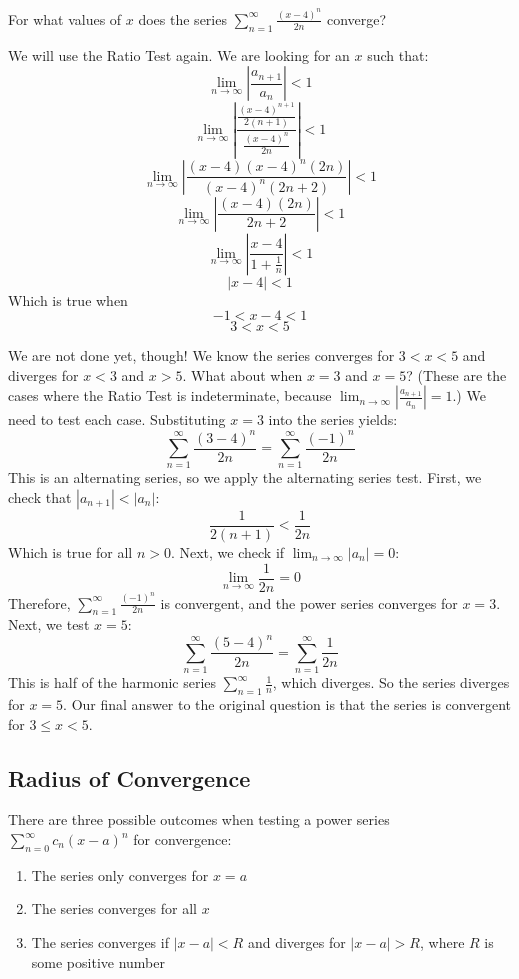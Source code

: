 \begin{Worked}
\begin{Problem}
For what values of $x$ does the series $\sum_{n=1}^\infty 
\frac{(x-4)^n}{2n}$ converge?
\end{Problem}
\begin{Solution}
We will use the Ratio Test again. We are looking for an $x$ 
such that:
$$\lim_{n \to \infty} \left| \frac{a_{n+1}}{a_n} \right| < 1$$
$$\lim_{n \to \infty} \left| \frac{\frac{(x-4)^{n+1}}{2(n+1)}}{\frac{(x-4)^n}{
2n}} \right| < 1$$
$$\lim_{n \to \infty} \left| \frac{(x-4)(x-4)^n(2n)}{(x-4)^n(2n+2)} \right| < 
1$$
$$\lim_{n \to \infty} \left| \frac{(x-4)(2n)}{2n + 2} \right| < 1$$
$$\lim_{n \to \infty} \left| \frac{x-4}{1 + \frac{1}{n}} \right| < 1$$
$$\left| x-4 \right| < 1$$
Which is true when 
$$-1 < x-4 < 1$$
$$3 < x < 5$$

We are not done yet, though! We know the series converges for $3 < x < 5$ 
and diverges for $x < 3$ and $x > 5$. What about when $x = 3$ and $x = 5$? 
(These are the cases where the Ratio Test is indeterminate, because 
$\lim_{n \to \infty} \left| \frac{a_{n+1}}{a_n} \right| = 1$.) We need to test 
each case. Substituting $x = 3$ into the series yields:
$$\sum_{n=1}^\infty \frac{(3-4)^n}{2n} = \sum_{n=1}^\infty \frac{(-1)^n}{2n}$$
This is an alternating series, so we apply the alternating series test. First, 
we check that $|a_{n+1}| < |a_n|$:
$$\frac{1}{2(n+1)} < \frac{1}{2n}$$
Which is true for all $n > 0$. Next, we check if $\lim_{n \to \infty} |a_n| = 0$:
$$\lim_{n \to \infty} \frac{1}{2n} = 0$$
Therefore, $\sum_{n=1}^\infty \frac{(-1)^n}{2n}$ is convergent, and the power 
series converges for $x = 3$. Next, we test $x = 5$:
$$\sum_{n=1}^\infty \frac{(5-4)^n}{2n} = \sum_{n=1}^\infty \frac{1}{2n}$$
This is half of the harmonic series $\sum_{n=1}^\infty \frac{1}{n}$, which 
diverges. So the series diverges for $x = 5$. Our final answer to the original 
question is that the series is convergent for $3 \leq x < 5$. 
\end{Solution}
\end{Worked}

\subsection{Radius of Convergence}
There are three possible outcomes when testing a power series $\sum_{n=0}^
\infty c_n (x-a)^n$ for convergence:
\begin{enumerate}
\item The series only converges for $x = a$
\item The series converges for all $x$
\item The series converges if $|x - a| < R$ and diverges for $|x - a| > R$, 
where $R$ is some positive number
\end{enumerate}

